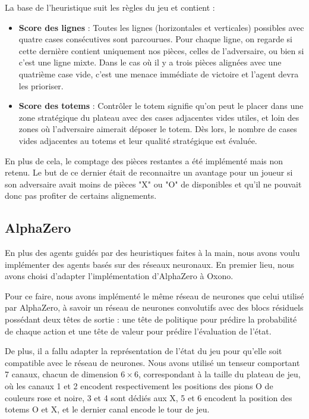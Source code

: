 \documentclass[a4paper,11pt]{article}
\begin{document}
La base de l'heuristique suit les règles du jeu et contient :
\begin{itemize}[nosep]
	\item \textbf{Score des lignes} : Toutes les lignes (horizontales et verticales) possibles avec quatre cases consécutives sont parcourues. Pour chaque ligne, on regarde si cette dernière contient uniquement nos pièces, celles de l'adversaire, ou bien si c'est une ligne mixte. Dans le cas où il y a trois pièces alignées avec une quatrième case vide, c'est une menace immédiate de victoire et l'agent devra les prioriser.
	\item \textbf{Score des totems} : Contrôler le totem signifie qu'on peut le placer dans une zone stratégique du plateau avec des cases adjacentes vides utiles, et loin des zones où l'adversaire aimerait déposer le totem. Dès lors, le nombre de cases vides adjacentes au totems et leur qualité stratégique est évaluée.
\end{itemize}

En plus de cela, le comptage des pièces restantes a été implémenté mais non retenu. Le but de ce dernier était de reconnaitre un avantage pour un joueur si son adversaire avait moins de pièces "X" ou "O" de disponibles et qu'il ne pouvait donc pas profiter de certains alignements.

\subsection{AlphaZero}
En plus des agents guidés par des heuristiques faites à la main, nous avons voulu implémenter des agents basés sur des réseaux neuronaux. En premier lieu, nous avons choisi d'adapter l'implémentation d'AlphaZero \citep{silver2016mastering, silver2017masteringchessshogiselfplay} à Oxono.

Pour ce faire, nous avons implémenté le même réseau de neurones que celui utilisé par AlphaZero, à savoir un réseau de neurones convolutifs avec des blocs résiduels possédant deux têtes de sortie : une tête de politique pour prédire la probabilité de chaque action et une tête de valeur pour prédire l'évaluation de l'état.

De plus, il a fallu adapter la représentation de l'état du jeu pour qu'elle soit compatible avec le réseau de neurones. Nous avons utilisé un tenseur comportant 7 canaux, chacun de dimension $6 \times 6$, correspondant à la taille du plateau de jeu, où les canaux 1 et 2 encodent respectivement les positions des pions O de couleurs rose et noire, 3 et 4 sont dédiés aux X, 5 et 6 encodent la position des totems O et X, et le dernier canal encode le tour de jeu.
\end{document}
